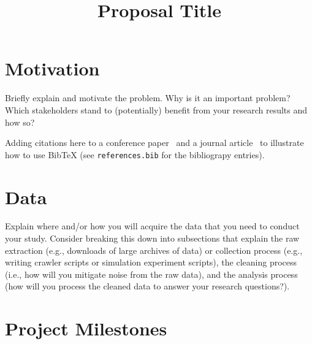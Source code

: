\documentclass[conference]{IEEEtran}
\begin{document}
\title{Proposal Title}

\author{
}

\maketitle



\section{Motivation}

Briefly explain and motivate the problem.
Why is it an important problem?
Which stakeholders stand to (potentially) benefit from your research results and how so?

Adding citations here to a conference paper~\cite{gallaba2022icse} and a journal article~\cite{mcintosh2018tse} to illustrate how to use BibTeX (see \texttt{references.bib} for the bibliograpy entries).

\section{Data}

Explain where and/or how you will acquire the data that you need to conduct your study.
Consider breaking this down into subsections that explain the raw extraction (e.g., downloads of large archives of data) or collection process (e.g., writing crawler scripts or simulation experiment scripts), the cleaning process (i.e., how will you mitigate noise from the raw data), and the analysis process (how will you process the cleaned data to answer your research questions?).

\section{Project Milestones}
\end{document}

